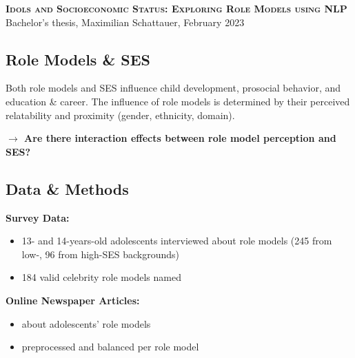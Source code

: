 

\fontsize{10}{10}
\geometry{a4paper, margin=2cm}


    \begin{center}
        \textsf{\textbf{\large{\textsc{Idols and Socioeconomic Status: Exploring Role Models using NLP}}}}\\
        Bachelor's thesis, Maximilian Schattauer, February 2023
    \end{center}


    \subsection*{Role Models \& SES}
    Both role models and SES influence child development, prosocial behavior, and education \& career.
    The influence of role models is determined by their perceived relatability and proximity (gender, ethnicity, domain).

    \textbf{$\rightarrow$ Are there interaction effects between role model perception and SES?}


    \subsection*{Data \& Methods}
    \begin{minipage}[t]{0.48\textwidth}
        \textbf{Survey Data:}
        \begin{itemize}
            \item 13- and 14-years-old adolescents interviewed about role models (245 from low-, 96 from high-SES backgrounds)
            \item 184 valid celebrity role models named
        \end{itemize}
    \end{minipage}
    \hspace{0.04\textwidth}
    \begin{minipage}[t]{0.48\textwidth}
        \textbf{Online Newspaper Articles:}
        \begin{itemize}
            \item about adolescents' role models
            \item preprocessed and balanced per role model
        \end{itemize}
    \end{minipage}

